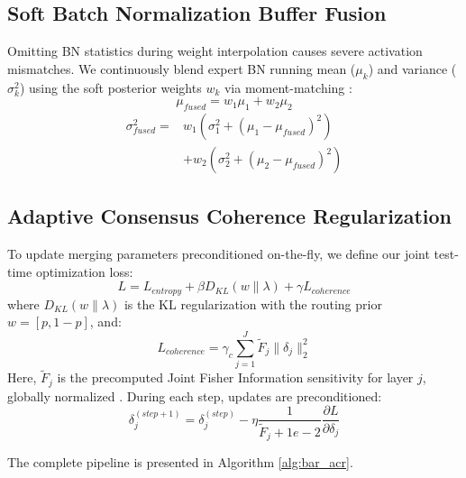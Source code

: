 \documentclass{article}
\theoremstyle{definition}
\theoremstyle{remark}
\begin{document}
\subsection{Soft Batch Normalization Buffer Fusion}
Omitting BN statistics during weight interpolation causes severe activation mismatches. We continuously blend expert BN running mean ($\mu_k$) and variance ($\sigma_k^2$) using the soft posterior weights $w_k$ via moment-matching \cite{seckler2022_53}:
\begin{equation}
\mu_{fused} = w_1 \mu_1 + w_2 \mu_2
\end{equation}
\begin{equation}
\begin{split}
\sigma_{fused}^2 = {}&w_1 (\sigma_1^2 + (\mu_1 - \mu_{fused})^2) \\
&+ w_2 (\sigma_2^2 + (\mu_2 - \mu_{fused})^2)
\end{split}
\end{equation}

\subsection{Adaptive Consensus Coherence Regularization}
To update merging parameters preconditioned on-the-fly, we define our joint test-time optimization loss:
\begin{equation}
L = L_{entropy} + \beta D_{KL}(w \| \lambda) + \gamma L_{coherence}
\end{equation}
where $D_{KL}(w \| \lambda)$ is the KL regularization with the routing prior $w = [p, 1-p]$, and:
\begin{equation}
L_{coherence} = \gamma_c \sum_{j=1}^J \tilde{F}_j \|\delta_j\|_2^2
\end{equation}
Here, $\tilde{F}_j$ is the precomputed Joint Fisher Information sensitivity for layer $j$, globally normalized \cite{maddox2019_54}. During each step, updates are preconditioned:
\begin{equation}
\delta_j^{(step+1)} = \delta_j^{(step)} - \eta \frac{1}{\tilde{F}_j + 1e-2} \frac{\partial L}{\partial \delta_j}
\end{equation}

The complete pipeline is presented in Algorithm \ref{alg:bar_acr}.
\end{document}
